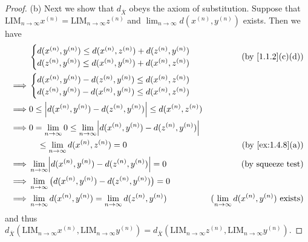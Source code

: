 \begin{proof}{(b)}
  Next we show that \(d_{\overline{X}}\) obeys the axiom of substitution.
  Suppose that \(\text{LIM}_{n \to \infty} x^{(n)} = \text{LIM}_{n \to \infty} z^{(n)}\) and \(\lim_{n \to \infty} d(x^{(n)}, y^{(n)})\) exists.
  Then we have
  \begin{align*}
             & \begin{cases}
                 d(x^{(n)}, y^{(n)}) \leq d(x^{(n)}, z^{(n)}) + d(z^{(n)}, y^{(n)}) \\
                 d(z^{(n)}, y^{(n)}) \leq d(x^{(n)}, y^{(n)}) + d(x^{(n)}, z^{(n)})
               \end{cases}                              & \text{(by \cref{1.1.2}(c)(d))}                                                                                        \\
    \implies & \begin{cases}
                 d(x^{(n)}, y^{(n)}) - d(z^{(n)}, y^{(n)}) \leq d(x^{(n)}, z^{(n)}) \\
                 d(z^{(n)}, y^{(n)}) - d(x^{(n)}, y^{(n)}) \leq d(x^{(n)}, z^{(n)})
               \end{cases}                                                                                               \\
    \implies & 0 \leq \abs{d(x^{(n)}, y^{(n)}) - d(z^{(n)}, y^{(n)})} \leq d(x^{(n)}, z^{(n)})                                                                                  \\
    \implies & 0 = \lim_{n \to \infty} 0 \leq \lim_{n \to \infty} \abs{d(x^{(n)}, y^{(n)}) - d(z^{(n)}, y^{(n)})}                                                               \\
             & \quad \leq \lim_{n \to \infty} d(x^{(n)}, z^{(n)}) = 0                                             & \text{(by \cref{ex:1.4.8}(a))}                              \\
    \implies & \lim_{n \to \infty} \abs{d(x^{(n)}, y^{(n)}) - d(z^{(n)}, y^{(n)})} = 0                            & \text{(by squeeze test)}                                    \\
    \implies & \lim_{n \to \infty} \big(d(x^{(n)}, y^{(n)}) - d(z^{(n)}, y^{(n)})\big) = 0                                                                                      \\
    \implies & \lim_{n \to \infty} d(x^{(n)}, y^{(n)}) = \lim_{n \to \infty} d(z^{(n)}, y^{(n)})                  & \text{(\(\lim_{n \to \infty} d(x^{(n)}, y^{(n)})\) exists)}
  \end{align*}
  and thus \(d_{\overline{X}}(\text{LIM}_{n \to \infty} x^{(n)}, \text{LIM}_{n \to \infty} y^{(n)}) = d_{\overline{X}}(\text{LIM}_{n \to \infty} z^{(n)}, \text{LIM}_{n \to \infty} y^{(n)})\).


\end{proof}
